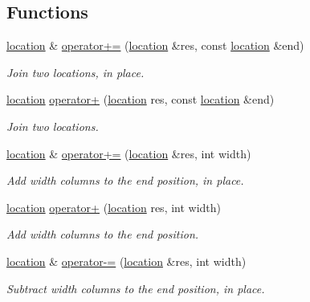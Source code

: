 \subsection*{Functions}
\begin{DoxyCompactItemize}
\item 
\hyperlink{classyy_1_1location}{location} \& \hyperlink{namespaceyy_ac14111e26538c547c68b89899951b6b7}{operator+=} (\hyperlink{classyy_1_1location}{location} \&res, const \hyperlink{classyy_1_1location}{location} \&end)
\begin{DoxyCompactList}\small\item\em Join two locations, in place. \end{DoxyCompactList}\item 
\hyperlink{classyy_1_1location}{location} \hyperlink{namespaceyy_ad82fe89bde177a8060bad10aca431c79}{operator+} (\hyperlink{classyy_1_1location}{location} res, const \hyperlink{classyy_1_1location}{location} \&end)
\begin{DoxyCompactList}\small\item\em Join two locations. \end{DoxyCompactList}\item 
\hyperlink{classyy_1_1location}{location} \& \hyperlink{namespaceyy_ab13826f998b111c25c9bf8132c4d63b8}{operator+=} (\hyperlink{classyy_1_1location}{location} \&res, int width)
\begin{DoxyCompactList}\small\item\em Add {\itshape width} columns to the end position, in place. \end{DoxyCompactList}\item 
\hyperlink{classyy_1_1location}{location} \hyperlink{namespaceyy_a79201bfa5eaeb04bf279a05ff13281df}{operator+} (\hyperlink{classyy_1_1location}{location} res, int width)
\begin{DoxyCompactList}\small\item\em Add {\itshape width} columns to the end position. \end{DoxyCompactList}\item 
\hyperlink{classyy_1_1location}{location} \& \hyperlink{namespaceyy_adf13d2c8b51d1b5c23eb84fce25d202c}{operator-\/=} (\hyperlink{classyy_1_1location}{location} \&res, int width)
\begin{DoxyCompactList}\small\item\em Subtract {\itshape width} columns to the end position, in place. \end{DoxyCompactList}\item 

\end{DoxyCompactItemize}

